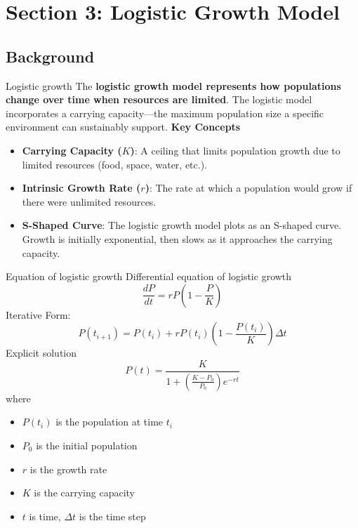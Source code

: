 \section{Section 3: Logistic Growth Model}
\subsection{Background}
\begin{frame}{Logistic growth}
    The \textbf{logistic growth model represents how populations change over time when resources are limited}. The logistic model incorporates a carrying capacity—the maximum population size a specific environment can sustainably support.
\pause
\vfill
\textbf{Key Concepts}

\begin{itemize}
    \item \textbf{Carrying Capacity ($K$)}: A ceiling that limits population growth due to limited resources (food, space, water, etc.).
    \pause
    \item \textbf{Intrinsic Growth Rate ($r$)}: The rate at which a population would grow if there were unlimited resources.
    \pause
    \item \textbf{S-Shaped Curve}: The logistic growth model plots as an S-shaped curve. Growth is initially exponential, then slows as it approaches the carrying capacity.
\end{itemize}

\end{frame}

\begin{frame}{Equation of logistic growth}
\footnotesize
Differential equation of logistic growth
\begin{equation*}
       \frac{dP}{dt} = rP\left(1 - \frac{P}{K}\right)
\end{equation*}
\pause
Iterative Form:
\begin{equation*}
 P(t_{i+1}) = P(t_i) + rP(t_i)\left(1 - \frac{P(t_i)}{K}\right) \Delta t
\end{equation*}
\pause
Explicit solution
\begin{equation*}
P(t) = \frac{K}{1 + \left(\frac{K - P_0}{P_0} \right) e^{-rt}}
\end{equation*}
\pause
where 
\begin{itemize}
    \item $P(t_i)$ is the population at time $t_i$
    \pause
    \item $P_0$ is the initial population
    \pause
    \item $r$ is the growth rate
    \pause
    \item $K$ is the carrying capacity
    \pause
    \item $t$ is time, $\Delta t$ is the time step
\end{itemize}
\end{frame}


